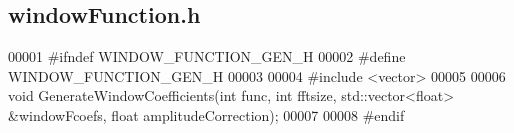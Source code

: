 \subsection{window\+Function.\+h}
\label{windowFunction_8h_source}

\begin{DoxyCode}
00001 \textcolor{preprocessor}{#ifndef WINDOW\_FUNCTION\_GEN\_H}
00002 \textcolor{preprocessor}{#define WINDOW\_FUNCTION\_GEN\_H}
00003 
00004 \textcolor{preprocessor}{#include <vector>}
00005 
00006 \textcolor{keywordtype}{void} GenerateWindowCoefficients(\textcolor{keywordtype}{int} func, \textcolor{keywordtype}{int} fftsize, std::vector<float> &windowFcoefs, \textcolor{keywordtype}{float} 
      amplitudeCorrection);
00007 
00008 \textcolor{preprocessor}{#endif}
\end{DoxyCode}
